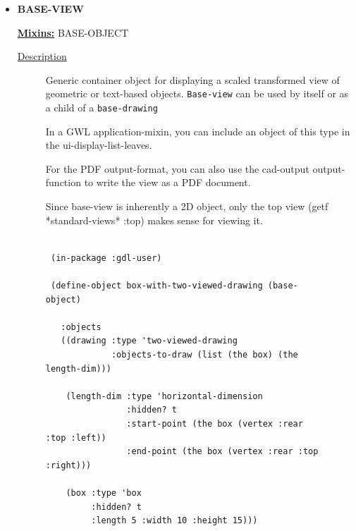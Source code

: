 \documentclass [11pt]{book}
\begin{document}
\begin{itemize}
\begin{description}
\end{description}







\item {}
\label{prim:base-view}
\textbf{BASE-VIEW}


\textbf{
\underline{Mixins:}} BASE-OBJECT





\begin{description}

\item [
\underline{Description}]


Generic container object for displaying a scaled transformed view of geometric or 
text-based objects. \texttt{Base-view} can be used by itself or as a child of a \texttt{base-drawing}

In a GWL application-mixin, you can include an object of this type in the ui-display-list-leaves.

For the PDF output-format, you can also use the cad-output output-function to write the 
view as a PDF document. 

Since base-view is inherently a 2D object, only the top view (getf *standard-views* :top) 
makes sense for viewing it.



\end{description}




\begin{figure}
\begin{lrbox}{\boxedverb}
\begin{minipage}{\linewidth}
{\small

\begin{verbatim}
                 
 (in-package :gdl-user)

 (define-object box-with-two-viewed-drawing (base-object)
  
   :objects
   ((drawing :type 'two-viewed-drawing
             :objects-to-draw (list (the box) (the length-dim)))
    
    (length-dim :type 'horizontal-dimension
                :hidden? t
                :start-point (the box (vertex :rear :top :left))
                :end-point (the box (vertex :rear :top :right)))
   
    (box :type 'box
         :hidden? t
         :length 5 :width 10 :height 15)))


\end{verbatim}}
\end{minipage}
\end{lrbox}
\end{figure}
\end{itemize}
\end{document}
